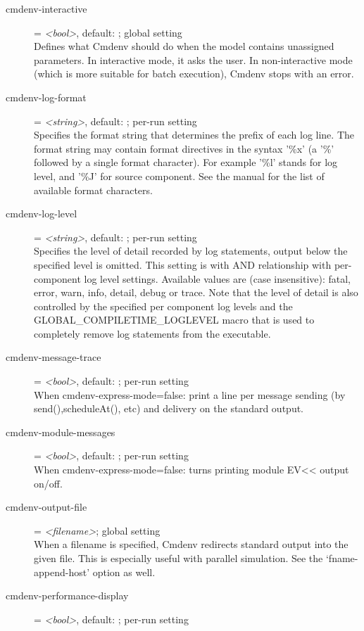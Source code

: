 \begin{description}
\item[cmdenv-interactive] = \textit{<bool>}, default: ; global setting \\
    Defines what Cmdenv should do when the model contains unassigned
    parameters. In interactive mode, it asks the user. In non-interactive mode
    (which is more suitable for batch execution), Cmdenv stops with an error.
\item[cmdenv-log-format] = \textit{<string>}, default: \ttt{[\%l]	}; per-run setting \\
    Specifies the format string that determines the prefix of each log line.
    The format string may contain format directives in the syntax '\%x' (a '\%'
    followed by a single format character).  For example '\%l' stands for log
    level, and '\%J' for source component. See the manual for the list of
    available format characters.
\item[cmdenv-log-level] = \textit{<string>}, default: ; per-run setting \\
    Specifies the level of detail recorded by log statements, output below the
    specified level is omitted. This setting is with AND relationship with
    per-component log level settings. Available values are (case insensitive):
    fatal, error, warn, info, detail, debug or trace. Note that the level of
    detail is also controlled by the specified per component log levels and the
    GLOBAL\_COMPILETIME\_LOGLEVEL macro that is used to completely remove log
    statements from the executable.
\item[cmdenv-message-trace] = \textit{<bool>}, default: ; per-run setting \\
    When cmdenv-express-mode=false: print a line per message sending (by
    send(),scheduleAt(), etc) and delivery on the standard output.
\item[cmdenv-module-messages] = \textit{<bool>}, default: ; per-run setting \\
    When cmdenv-express-mode=false: turns printing module EV<< output on/off.
\item[cmdenv-output-file] = \textit{<filename>}; global setting \\
    When a filename is specified, Cmdenv redirects standard output into the
    given file. This is especially useful with parallel simulation. See the
    `fname-append-host' option as well.
\item[cmdenv-performance-display] = \textit{<bool>}, default: ; per-run setting \\

\end{description}
